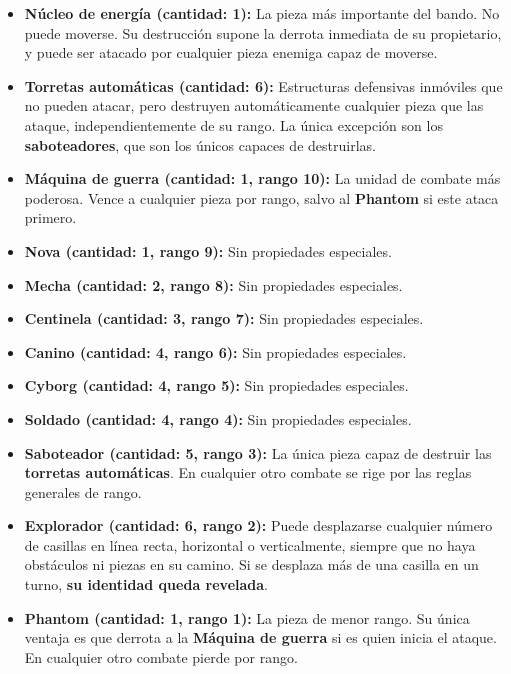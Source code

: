 \begin{itemize}
	\item \textbf{Núcleo de energía (cantidad: 1):} La pieza más importante del bando. No puede moverse. Su destrucción supone la derrota inmediata de su propietario, y puede ser atacado por cualquier pieza enemiga capaz de moverse.
	
	\item \textbf{Torretas automáticas (cantidad: 6):} Estructuras defensivas inmóviles que no pueden atacar, pero destruyen automáticamente cualquier pieza que las ataque, independientemente de su rango. La única excepción son los \textbf{saboteadores}, que son los únicos capaces de destruirlas.
	
	\item \textbf{Máquina de guerra (cantidad: 1, rango 10):} La unidad de combate más poderosa. Vence a cualquier pieza por rango, salvo al \textbf{Phantom} si este ataca primero.
	
	\item \textbf{Nova (cantidad: 1, rango 9):} Sin propiedades especiales.
	
	\item \textbf{Mecha (cantidad: 2, rango 8):} Sin propiedades especiales.
	
	\item \textbf{Centinela (cantidad: 3, rango 7):} Sin propiedades especiales.
	
	\item \textbf{Canino (cantidad: 4, rango 6):} Sin propiedades especiales.
	
	\item \textbf{Cyborg (cantidad: 4, rango 5):} Sin propiedades especiales.
	
	\item \textbf{Soldado (cantidad: 4, rango 4):} Sin propiedades especiales.
	
	\item \textbf{Saboteador (cantidad: 5, rango 3):} La única pieza capaz de destruir las \textbf{torretas automáticas}. En cualquier otro combate se rige por las reglas generales de rango.
	
	\item \textbf{Explorador (cantidad: 6, rango 2):} Puede desplazarse cualquier número de casillas en línea recta, horizontal o verticalmente, siempre que no haya obstáculos ni piezas en su camino. Si se desplaza más de una casilla en un turno, \textbf{su identidad queda revelada}.
	
	\item \textbf{Phantom (cantidad: 1, rango 1):} La pieza de menor rango. Su única ventaja es que derrota a la \textbf{Máquina de guerra} si es quien inicia el ataque. En cualquier otro combate pierde por rango.
	
\end{itemize}

